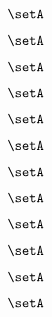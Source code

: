 \begin{forslides}
    \begin{equation}
        \label{eq:slides-translation-125}
        \setA
    \end{equation}

    \begin{equation}
        \label{eq:slides-translation-126}
        \setA
    \end{equation}

    \begin{equation}
        \label{eq:slides-translation-127}
        \setA
    \end{equation}

    \begin{equation}
        \label{eq:slides-translation-128}
        \setA
    \end{equation}

    \begin{equation}
        \label{eq:slides-translation-129}
        \setA
    \end{equation}
    
    \begin{equation}
        \label{eq:slides-translation-130}
        \setA
    \end{equation}

    \begin{equation}
        \label{eq:slides-translation-131}
        \setA
    \end{equation}

    \begin{equation}
        \label{eq:slides-translation-132}
        \setA
    \end{equation}

    \begin{equation}
        \label{eq:slides-translation-133}
        \setA
    \end{equation}

    \begin{equation}
        \label{eq:slides-translation-134}
        \setA
    \end{equation}

    \begin{equation}
        \label{eq:slides-translation-135}
        \setA
    \end{equation}

    \begin{equation}
        \label{eq:slides-translation-136}
        \setA
    \end{equation}


\end{forslides}
